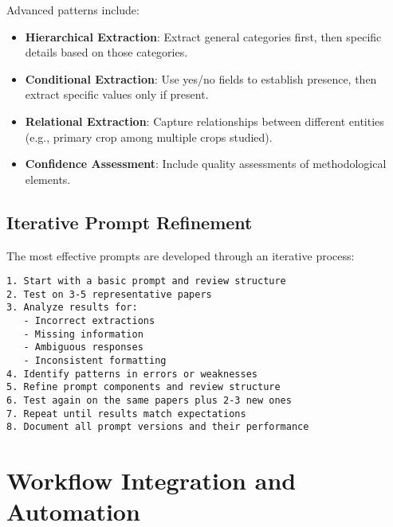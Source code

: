 Advanced patterns include:

\begin{itemize}
    \item \textbf{Hierarchical Extraction}: Extract general categories first, then specific details based on those categories.
    \item \textbf{Conditional Extraction}: Use yes/no fields to establish presence, then extract specific values only if present.
    \item \textbf{Relational Extraction}: Capture relationships between different entities (e.g., primary crop among multiple crops studied).
    \item \textbf{Confidence Assessment}: Include quality assessments of methodological elements.
\end{itemize}


\subsection{Iterative Prompt Refinement}

The most effective prompts are developed through an iterative process:

\begin{commandbox}
\begin{lstlisting}
1. Start with a basic prompt and review structure
2. Test on 3-5 representative papers
3. Analyze results for:
   - Incorrect extractions
   - Missing information
   - Ambiguous responses
   - Inconsistent formatting
4. Identify patterns in errors or weaknesses
5. Refine prompt components and review structure
6. Test again on the same papers plus 2-3 new ones
7. Repeat until results match expectations
8. Document all prompt versions and their performance
\end{lstlisting}
\end{commandbox}


\section{Workflow Integration and Automation}

